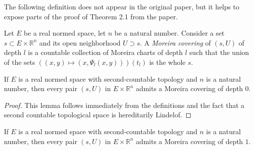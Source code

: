 The following definition does not appear in the original paper,
but it helps to expose parts of the proof of Theorem 2.1 from the paper.
\begin{definition}%
  \label{def:moreira-covering}
  Let \(E\) be a real normed space, let \(n\) be a natural number.
  Consider a set \(s\subset E \times \mathbb R^{n}\) and its open neighborhood \(U\supset s\).
  A \emph{Moreira covering} of \((s, U)\) of depth \(l\)
  is a countable collection of Moreira charts of depth \(l\)
  such that the union of the sets \(((x, y) \mapsto (x, \Psi_{l}(x, y)))(t_{l})\) is the whole \(s\).
\end{definition}

\begin{lemma}%
  \label{lem:moreira-covering-zero}
  If \(E\) is a real normed space with second-countable topology and \(n\) is a natural number,
  then every pair \((s, U)\) in \(E\times\mathbb R^{n}\)
  admits a Moreira covering of depth \(0\).
\end{lemma}

\begin{proof}
  This lemma follows immediately from the definitions
  and the fact that a second countable topological space is hereditarily Lindelof.
\end{proof}

\begin{lemma}%
  \label{lem:moreira-covering-one}
  If \(E\) is a real normed space with second-countable topology and \(n\) is a natural number,
  then every pair \((s, U)\) in \(E\times\mathbb R^{n}\)
  admits a Moreira covering of depth \(1\).
\end{lemma}

